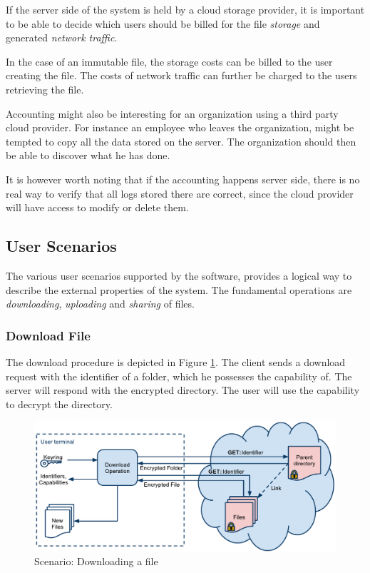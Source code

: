 \documentclass[pdftex,english,10pt,b5paper,twoside]{book}
\begin{document}
If the server side of the system is held by a cloud storage provider, it
is important to be able to decide which users should be billed for the file
\emph{storage} and generated \emph{network traffic}.

In the case of an immutable file, the storage costs can be billed to the user
creating the file. The costs of network traffic can further be charged to the
users retrieving the file.

Accounting might also be interesting for an organization using a third party
cloud provider. For instance an employee who leaves the organization, might be
tempted to copy all the data stored on the server. The organization should then
be able to discover what he has done.

It is however worth noting that if the accounting happens server side, there is
no real way to verify that all logs stored there are correct, since the cloud
provider will have access to modify or delete them.

\subsection{User Scenarios}

The various user scenarios supported by the software, provides a logical way to
describe the external properties of the system. The fundamental operations are
\emph{downloading}, \emph{uploading} and \emph{sharing} of files.

\subsubsection{Download File}

The download procedure is depicted in Figure \ref{fig:AS:download}. The client
sends a download request with the identifier of a folder, which he possesses
the capability of. The server will respond with the encrypted directory.
The user will use the capability to decrypt the directory.

\begin{figure}[h!]
    \centering
    \includegraphics[width=\columnwidth]{ArchitectureDownload.pdf}
    \caption{Scenario: Downloading a file}
    \label{fig:AS:download}
\end{figure}
\end{document}

